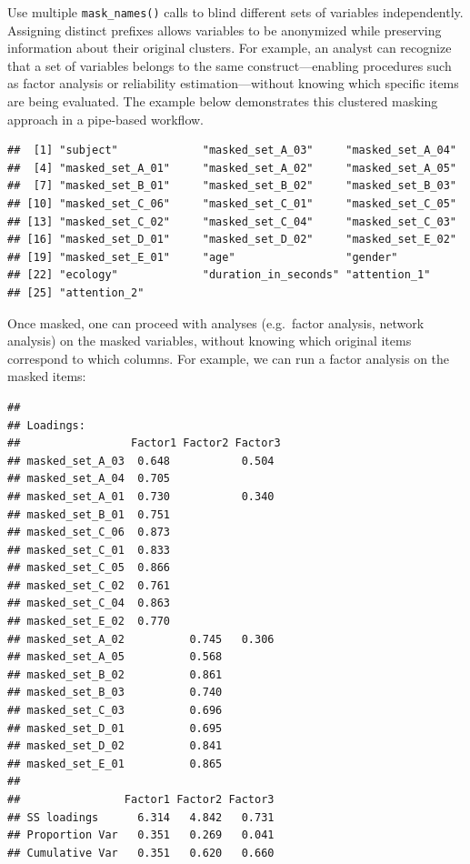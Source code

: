 \documentclass[
  english,
  man,floatsintext]{apa6}
\begin{document}
Use multiple \texttt{mask\_names()} calls to blind different sets of variables independently. Assigning distinct prefixes allows variables to be anonymized while preserving information about their original clusters. For example, an analyst can recognize that a set of variables belongs to the same construct---enabling procedures such as factor analysis or reliability estimation---without knowing which specific items are being evaluated. The example below demonstrates this clustered masking approach in a pipe-based workflow.

\begin{verbatim}
##  [1] "subject"             "masked_set_A_03"     "masked_set_A_04"    
##  [4] "masked_set_A_01"     "masked_set_A_02"     "masked_set_A_05"    
##  [7] "masked_set_B_01"     "masked_set_B_02"     "masked_set_B_03"    
## [10] "masked_set_C_06"     "masked_set_C_01"     "masked_set_C_05"    
## [13] "masked_set_C_02"     "masked_set_C_04"     "masked_set_C_03"    
## [16] "masked_set_D_01"     "masked_set_D_02"     "masked_set_E_02"    
## [19] "masked_set_E_01"     "age"                 "gender"             
## [22] "ecology"             "duration_in_seconds" "attention_1"        
## [25] "attention_2"
\end{verbatim}

Once masked, one can proceed with analyses (e.g.~factor analysis, network analysis) on the masked variables, without knowing which original items correspond to which columns. For example, we can run a factor analysis on the masked items:

\begin{verbatim}
## 
## Loadings:
##                 Factor1 Factor2 Factor3
## masked_set_A_03  0.648           0.504 
## masked_set_A_04  0.705                 
## masked_set_A_01  0.730           0.340 
## masked_set_B_01  0.751                 
## masked_set_C_06  0.873                 
## masked_set_C_01  0.833                 
## masked_set_C_05  0.866                 
## masked_set_C_02  0.761                 
## masked_set_C_04  0.863                 
## masked_set_E_02  0.770                 
## masked_set_A_02          0.745   0.306 
## masked_set_A_05          0.568         
## masked_set_B_02          0.861         
## masked_set_B_03          0.740         
## masked_set_C_03          0.696         
## masked_set_D_01          0.695         
## masked_set_D_02          0.841         
## masked_set_E_01          0.865         
## 
##                Factor1 Factor2 Factor3
## SS loadings      6.314   4.842   0.731
## Proportion Var   0.351   0.269   0.041
## Cumulative Var   0.351   0.620   0.660
\end{verbatim}
\end{document}
